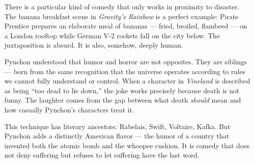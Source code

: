 \documentclass[10pt,a4paper]{article}
\begin{document}
\begin{tcolorbox}[colback=white, colframe=black]
\small
There is a particular kind of comedy that only works in proximity to
disaster. The banana breakfast scene in \emph{Gravity's Rainbow} is
a perfect example: Pirate Prentice prepares an elaborate meal of
bananas --- fried, broiled, flambeed --- on a London rooftop while
German V-2 rockets fall on the city below. The juxtaposition is
absurd. It is also, somehow, deeply human.

Pynchon understood that humor and horror are not opposites. They are
siblings --- born from the same recognition that the universe
operates according to rules we cannot fully understand or control.
When a character in \emph{Vineland} is described as being ``too dead
to lie down,'' the joke works precisely because death is not funny.
The laughter comes from the gap between what death \emph{should}
mean and how casually Pynchon's characters treat it.

This technique has literary ancestors: Rabelais, Swift, Voltaire,
Kafka. But Pynchon adds a distinctly American flavor --- the humor
of a country that invented both the atomic bomb and the whoopee
cushion. It is comedy that does not deny suffering but refuses to
let suffering have the last word.
\end{tcolorbox}
\end{document}
